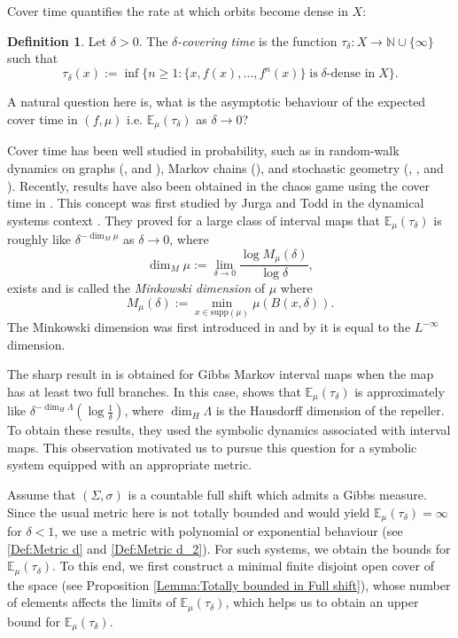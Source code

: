 \documentclass[11pt, reqno]{amsart}
\theoremstyle{plain}%
\theoremstyle{definition}
\newtheorem{definition}[theorem]{Definition}
\theoremstyle{definition}
\def\N{\ensuremath{\mathbb N}}
\def\E{\mathbb E}
\numberwithin{equation}{section}
\begin{document}
Cover time quantifies the rate at which orbits become dense in $X$:
\begin{definition}
    Let $\delta>0$. The \textit{$\delta$-covering time} is the function $\tau_\delta:X\to \N \cup \{\infty\}$ such that 
    \begin{equation}
        \tau_\delta(x):=\inf \{n\ge 1 : \{x, f(x),\ldots,f^n(x)\}\; \text{is} \; \delta\text{-dense in} \; X\}.
    \end{equation}
\end{definition}
A natural question here is, what is the asymptotic behaviour of the expected cover time in $(f,\mu)$ i.e. $\E_\mu (\tau_\delta)$ as $\delta \to 0$?


Cover time has been well studied in probability, such as in random-walk dynamics on graphs (\cite{Aldo1}, \cite{Lova} and \cite{DingLeePe}), Markov chains (\cite{LeviPer}), and stochastic geometry (\cite{FlaNew}, \cite{Janson}, \cite{Pesin} and \cite{Aldo2}). Recently, results have also been obtained in the chaos game using the cover time in \cite{JurgMorr, BarJurKol}. This concept was first studied by Jurga and Todd in the dynamical systems context \cite{MikeNatali}.
They proved for a large class of interval maps that $\E_\mu (\tau_\delta)$ is roughly like $\delta^{-\dim_M\mu}$  as $\delta\to 0$, where
\begin{equation}\label{Def: Minkowski}
\dim_M\mu:=\lim_{\delta\to0}\frac{\log M_{\mu}(\delta)}{\log\delta},\end{equation}
exists and is called the \textit{Minkowski dimension} of $\mu$  where $$M_{\mu}(\delta):=\min_{x\in\text{supp}(\mu)}\mu(B(x,\delta)).$$ The Minkowski dimension was first introduced in \cite{KennethJon} and by \cite[Proposition 4.2]{KennethJon} it is equal to the $L^{-\infty}$ dimension.

The sharp result in \cite{MikeNatali} is obtained for Gibbs Markov interval maps when the map has at least two full branches. In this case, \cite[Theorem 2.1]{MikeNatali} shows that $\E_{\mu} (\tau_\delta)$ is approximately like $ \delta^{-\dim_H\Lambda}\left(\log\frac{1}{\delta}\right)$, where $\dim_H\Lambda$ is the Hausdorff dimension of the repeller.
To obtain these results, they used the symbolic dynamics associated with interval maps. This observation motivated us to pursue this question for a symbolic system equipped with an appropriate metric. 

Assume that $(\Sigma,\sigma)$ is a countable full shift which admits a Gibbs measure. Since the usual metric here is not totally bounded and would yield $\E_{\mu} (\tau_\delta)=\infty$ for $\delta<1$, we use a metric with polynomial or exponential behaviour (see \eqref{Def:Metric d} and \eqref{Def:Metric d_2}). For such systems, we obtain the bounds for $\E_{\mu} (\tau_\delta)$. To this end, we first construct a minimal finite disjoint open cover of the space (see Proposition \ref{Lemma:Totally bounded in Full shift}), whose number of elements affects the limits of $\E_{\mu} (\tau_\delta)$, which helps us to obtain an upper bound for $\E_{\mu} (\tau_\delta)$.
\end{document}
